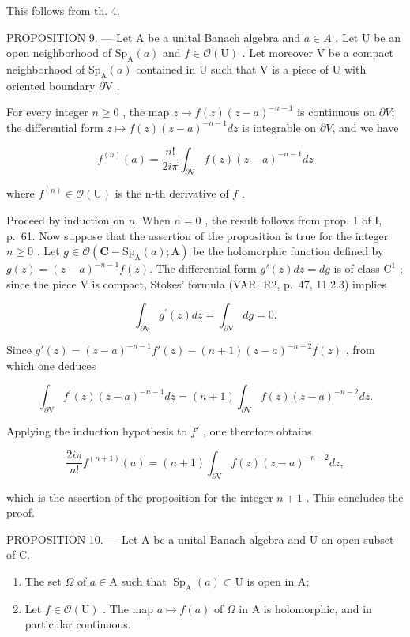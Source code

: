 This follows from th. 4.

PROPOSITION 9. --- Let A be a unital Banach algebra and \(a \in A\) . Let U be an open neighborhood of \(\mathrm{Sp}_{\mathrm{A}}(a)\) and \(f \in \mathcal{O}(\mathrm{U})\) . Let moreover V be a compact neighborhood of \(\mathrm{Sp}_{\mathrm{A}}(a)\) contained in U such that V is a piece of U with oriented boundary \(\partial\mathrm{V}\) .

For every integer \(n \geqslant 0\) , the map \(z \mapsto f(z)(z - a)^{-n-1}\) is continuous on \(\partial V\); the differential form \(z \mapsto f(z)(z - a)^{-n-1} dz\) is integrable on \(\partial V\), and we have

\[
f ^ {(n)} (a) = \frac {n !}{2 i \pi} \int_ {\partial \mathrm{V}} f (z) (z - a) ^ {- n - 1} d z\tag{7}
\]

where \(f^{(n)}\in\mathcal{O}(\mathrm{U})\) is the n-th derivative of \(f\) .

Proceed by induction on \(n\). When \(n = 0\) , the result follows from prop. 1 of I, p.~61. Now suppose that the assertion of the proposition is true for the integer \(n \geqslant 0\) . Let \(g \in \mathcal{O}(\mathbf{C} - \mathrm{Sp}_{\mathrm{A}}(a); \mathrm{A})\) be the holomorphic function defined by \(g(z) = (z - a)^{-n-1} f(z)\). The differential form \(g'(z) dz = dg\) is of class \(\mathrm{C}^1\) ; since the piece V is compact, Stokes' formula (VAR, R2, p.~47, 11.2.3) implies

\[
\int_ {\partial \mathrm{V}} g ^ {\prime} (z) d z = \int_ {\partial \mathrm{V}} d g = 0.
\]

Since \(g'(z) = (z - a)^{-n-1} f'(z) - (n+1)(z - a)^{-n-2} f(z)\) , from which one deduces

\[
\int_ {\partial \mathrm{V}} f ^ {\prime} (z) (z - a) ^ {- n - 1} d z = (n + 1) \int_ {\partial \mathrm{V}} f (z) (z - a) ^ {- n - 2} d z.
\]

Applying the induction hypothesis to \(f'\) , one therefore obtains

\[
\frac {2 i \pi}{n !} f ^ {(n + 1)} (a) = (n + 1) \int_ {\partial \mathrm{V}} f (z) (z - a) ^ {- n - 2} d z,
\]

which is the assertion of the proposition for the integer \(n+1\) . This concludes the proof.

PROPOSITION 10. --- Let A be a unital Banach algebra and U an open subset of C.

\begin{enumerate}
\def\labelenumi{\alph{enumi})}
\tightlist
\item
  The set \(\Omega\) of \(a \in \mathrm{A}\) such that \(\operatorname{Sp}_{\mathrm{A}}(a) \subset \mathrm{U}\) is open in A;
\item
  Let \(f \in \mathcal{O}(\mathrm{U})\) . The map \(a \mapsto f(a)\) of \(\Omega\) in A is holomorphic, and in particular continuous.
\end{enumerate}


